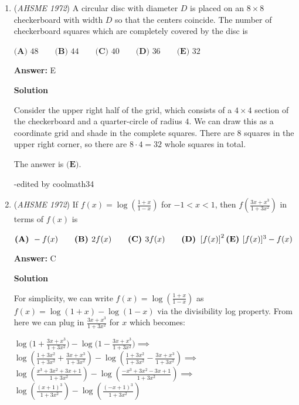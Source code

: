 \begin{enumerate}
 
Squaring both sides gives us that $rs=144$. We can substitute this value into the equation we had earlier. This gives us 
 \[\frac{1}{2}\times144\times\sin A=64\]
 \[72\sin A=64\]
 \[\sin A=\frac{64}{72}=\frac{8}{9} \Rightarrow \boxed{\text{D}}\]

 -edited for readability

 


	\item (\textit{AHSME 1972}) A circular disc with diameter $D$ is placed on an $8\times 8$ checkerboard with width $D$ so that the centers coincide. The number of checkerboard squares which are completely covered by the disc is


 $\textbf{(A) }48\qquad \textbf{(B) }44\qquad \textbf{(C) }40\qquad \textbf{(D) }36\qquad  \textbf{(E) }32$

 \textbf{Answer: }E



\textbf{Solution}

Consider the upper right half of the grid, which consists of a $4\times4$ section of the checkerboard and a quarter-circle of radius $4$. We can draw this as a coordinate grid and shade in the complete squares. There are $8$ squares in the upper right corner, so there are $8 \cdot 4 = \boxed{32}$ whole squares in total.

 The answer is $\textbf{(E)}.$

 -edited by coolmath34

 


	\item (\textit{AHSME 1972}) If $f(x)=\log \left(\frac{1+x}{1-x}\right)$ for $-1<x<1$, then $f\left(\frac{3x+x^3}{1+3x^2}\right)$ in terms of $f(x)$ is


 $\textbf{(A) }-f(x)\qquad \textbf{(B) }2f(x)\qquad \textbf{(C) }3f(x)\qquad \textbf{(D) }\left[f(x)\right]^2\qquad \\ \textbf{(E) }[f(x)]^3-f(x)$

 \textbf{Answer: }C



\textbf{Solution}

For simplicity, we can write $f(x) = \log(\frac{1+x}{1-x})$ as $f(x) = \log({1+x}) - \log({1-x})$ via the divisibility log property. From here we can plug in $\frac{3x+x^3}{1+3x^2}$ for $x$ which becomes:

 $\log({1+\frac{3x+x^3}{1+3x^2})} - \log({1-\frac{3x+x^3}{1+3x^2})} \implies$
$\log{(\frac{1+3x^2}{1+3x^2}+\frac{3x+x^3}{1+3x^2})} - \log{(\frac{1+3x^2}{1+3x^2}-\frac{3x+x^3}{1+3x^2})} \implies$
$\log{(\frac{x^3+3x^2+3x+1}{1+3x^2})} - \log{(\frac{-x^3+3x^2-3x+1}{1+3x^2})} \implies$
$\log{(\frac{(x+1)^3}{1+3x^2})} - \log{(\frac{(-x+1)^3}{1+3x^2})}$


\end{enumerate}
